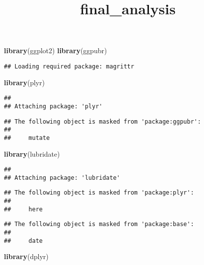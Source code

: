 \documentclass[]{article}
\title{final\_analysis}
\author{}
\date{}
\newenvironment{Shaded}{\begin{snugshade}}{\end{snugshade}}
\newcommand{\KeywordTok}[1]{\textcolor[rgb]{0.13,0.29,0.53}{\textbf{#1}}}
\newcommand{\NormalTok}[1]{#1}
\begin{document}
\maketitle

\begin{Shaded}
\begin{Highlighting}[]
\KeywordTok{library}\NormalTok{(ggplot2)}
\KeywordTok{library}\NormalTok{(ggpubr)}
\end{Highlighting}
\end{Shaded}

\begin{verbatim}
## Loading required package: magrittr
\end{verbatim}

\begin{Shaded}
\begin{Highlighting}[]
\KeywordTok{library}\NormalTok{(plyr)}
\end{Highlighting}
\end{Shaded}

\begin{verbatim}
## 
## Attaching package: 'plyr'
\end{verbatim}

\begin{verbatim}
## The following object is masked from 'package:ggpubr':
## 
##     mutate
\end{verbatim}

\begin{Shaded}
\begin{Highlighting}[]
\KeywordTok{library}\NormalTok{(lubridate)}
\end{Highlighting}
\end{Shaded}

\begin{verbatim}
## 
## Attaching package: 'lubridate'
\end{verbatim}

\begin{verbatim}
## The following object is masked from 'package:plyr':
## 
##     here
\end{verbatim}

\begin{verbatim}
## The following object is masked from 'package:base':
## 
##     date
\end{verbatim}

\begin{Shaded}
\begin{Highlighting}[]
\KeywordTok{library}\NormalTok{(dplyr)}
\end{Highlighting}
\end{Shaded}
\end{document}
